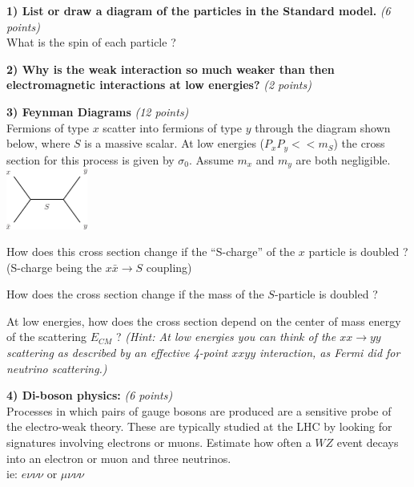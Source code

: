 {\large


\textbf{1) List or draw a diagram of the particles in the Standard model. } \hfill \textit{(6 points)}\\
What is the spin of each particle ?

\vspace*{3.5in}


\textbf{2) Why is the weak interaction so much weaker than then electromagnetic interactions at low energies?} \hfill \textit{(2 points)}\\

\vspace*{0.5in}

\clearpage

\textbf{3) Feynman Diagrams }\hfill \textit{(12 points)}\\
Fermions of type $x$ scatter into fermions of type $y$ through the diagram shown below, where $S$ is a massive scalar. 
At low energies ($P_x P_y << m_S$) the cross section for this process is given by $\sigma_0$.
Assume $m_x$ and $m_y$ are both negligible.
\bc
\includegraphics[width=0.2\textwidth]{./xxToyy.pdf}
\ec
\bi
\item[a)] How does this cross section change if the ``S-charge'' of the $x$ particle is doubled ? \\ (S-charge being the $x\bar{x} \rightarrow S$ coupling) 
\vspace*{1.5in}
\item[b)] How does the cross section change if the mass of the $S$-particle is doubled ?
\vspace*{1.5in}
\item[c)] At low energies, how does the cross section depend on the center of mass energy of the scattering $E_{CM}$ ? 
\textit{(Hint: At low energies you can think of the $xx \rightarrow yy$ scattering as described by an effective 4-point $xxyy$ interaction, as Fermi did for neutrino scattering.)}
\ei

\clearpage

\textbf{4) Di-boson physics:  } \hfill \textit{(6 points)}\\
Processes in which pairs of gauge bosons are produced are a sensitive probe of the electro-weak theory. These are typically studied at the LHC by looking for signatures involving electrons or muons.  
Estimate how often a $WZ$ event decays into an electron or muon and three neutrinos.\\ ie: $e\nu\nu\nu$ or $\mu\nu\nu\nu$

}
